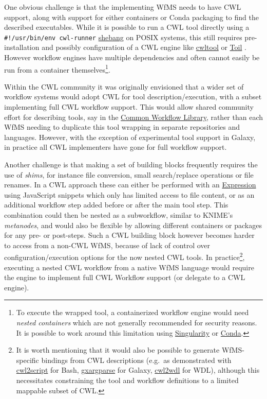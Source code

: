 One obvious challenge is that the implementing WfMS needs to have CWL
support, along with support for either containers or Conda packaging to
find the described executables. While it is possible to run a CWL tool
directly using a \texttt{\#!/usr/bin/env\ cwl-runner}
\href{https://en.wikipedia.org/wiki/Shebang_(Unix)}{shebang} on POSIX
systems, this still requires pre-installation and possibly configuration
of a CWL engine like \href{https://pypi.org/project/cwltool/}{cwltool}
or \href{https://toil.readthedocs.io/en/latest/running/cwl.html}{Toil}
\cite{ch6-33}. However workflow engines have multiple dependencies and often
cannot easily be run from a container themselves\footnote{To execute the
  wrapped tool, a containerized workflow engine would need \emph{nested
  containers} which are not generally recommended for security reasons.
  It is possible to work around this limitation using
  \href{https://sylabs.io/singularity/}{Singularity} or
  \href{https://docs.bioexcel.eu/cwl-best-practice-guide/devpractice/containers/conda.html}{Conda}.}.

Within the CWL community it was originally envisioned that a wider set
of workflow systems would adopt CWL for tool description/execution, with
a subset implementing full CWL workflow support. This would allow shared
community effort for describing tools, say in the
\href{https://github.com/common-workflow-library/}{Common Workflow
Library}, rather than each WfMS needing to duplicate this tool wrapping
in separate repositories and languages. However, with the exception of
experimental tool support in Galaxy, in practice all CWL implementers
have gone for full workflow support.

Another challenge is that making a set of building blocks frequently
requires the use of \emph{shims}, for instance file conversion, small
search/replace operations or file renames. In a CWL approach these can
either be performed with an
\href{https://www.commonwl.org/v1.2/Workflow.html\#Expressions_(Optional)}{Expression}
using JavaScript snippets which only has limited access to file content,
or as an additional workflow step added before or after the main tool
step. This combination could then be nested as a subworkflow, similar to
KNIME's \emph{metanodes}, and would also be flexible by allowing
different containers or packages for any pre- or post-steps. Such a CWL
building block however becomes harder to access from a non-CWL WfMS,
because of lack of control over configuration/execution options for the
now nested CWL tools. In practice\footnote{It is worth mentioning that
  it would also be possible to generate WfMS-specific bindings from CWL
  descriptions (e.g.~as demonstrated with
  \href{https://github.com/common-workflow-lab/cwl2script}{cwl2script}
  for Bash,
  \href{https://github.com/common-workflow-lab/gxargparse}{gxargparse}
  for Galaxy,
  \href{https://github.com/common-workflow-lab/cwl2wdl}{cwl2wdl} for
  WDL), although this necessitates constraining the tool and workflow
  definitions to a limited mappable subset of CWL.}, executing a nested
CWL workflow from a native WfMS language would require the engine to
implement full CWL Workflow support (or delegate to a CWL engine).

